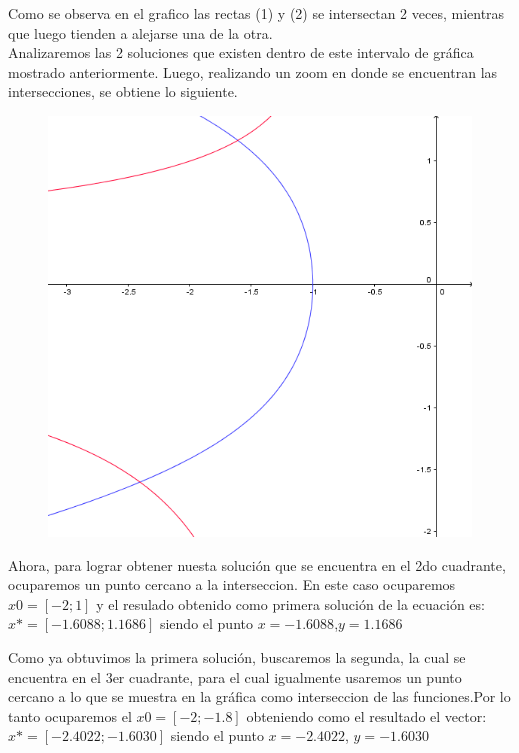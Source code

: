 \documentclass{udpreport}
\begin{document}
\begin{enumerate}
            Como se observa en el grafico las rectas (1) y (2) se intersectan 2 veces, mientras que luego tienden a alejarse una de la otra. \\Analizaremos las 2 soluciones que existen dentro de este intervalo de gráfica mostrado anteriormente. Luego, realizando un zoom en donde se encuentran las intersecciones, se obtiene lo siguiente.\\
            
            \begin{figure}[H]
               \centering   \includegraphics[width=13cm]{GraficoEcEj1azoom}
            \end{figure}
            Ahora, para lograr obtener nuesta solución que se encuentra en el 2do cuadrante, ocuparemos un punto cercano a la interseccion. En este caso ocuparemos $ x0=[-2;1] $ y el resulado obtenido como primera solución de la ecuación es:
            $ x*=[-1.6088;1.1686 ]$ siendo el punto  $x = -1.6088$,$y = 1.1686$
            
            Como ya obtuvimos la primera solución, buscaremos la segunda, la cual se encuentra en el 3er cuadrante, para el cual igualmente usaremos un punto cercano a lo que se muestra en la gráfica como interseccion de las funciones.Por lo tanto ocuparemos el $x0=[-2;-1.8] $ obteniendo como el resultado el vector:
            $x*=[-2.4022;-1.6030]$ siendo el punto $x=-2.4022$, $y=-1.6030$


\end{enumerate}
\end{document}
